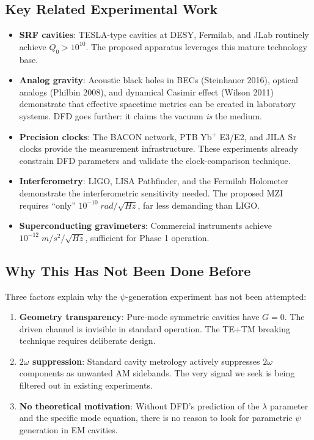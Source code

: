 \documentclass[11pt,a4paper]{article}
\begin{document}
\subsection{Key Related Experimental Work}

\begin{itemize}[nosep]
\item \textbf{SRF cavities}: TESLA-type cavities at DESY, Fermilab,
and JLab routinely achieve $Q_0 > 10^{10}$.  The proposed apparatus
leverages this mature technology base.

\item \textbf{Analog gravity}: Acoustic black holes in BECs
(Steinhauer 2016), optical analogs (Philbin 2008), and dynamical
Casimir effect (Wilson 2011) demonstrate that effective spacetime
metrics can be created in laboratory systems.  DFD goes further:
it claims the vacuum \emph{is} the medium.

\item \textbf{Precision clocks}: The BACON network, PTB Yb$^+$
E3/E2, and JILA Sr clocks provide the measurement infrastructure.
These experiments already constrain DFD parameters and validate
the clock-comparison technique.

\item \textbf{Interferometry}: LIGO, LISA Pathfinder, and
the Fermilab Holometer demonstrate the interferometric sensitivity
needed.  The proposed MZI requires ``only''
$10^{-10}\;\si{rad/\sqrt{Hz}}$, far less demanding than LIGO.

\item \textbf{Superconducting gravimeters}: Commercial instruments
achieve $10^{-12}\;\si{m/s^2/\sqrt{Hz}}$, sufficient for Phase 1
operation.
\end{itemize}

\subsection{Why This Has Not Been Done Before}

Three factors explain why the $\psi$-generation experiment has not
been attempted:

\begin{enumerate}[nosep]
\item \textbf{Geometry transparency}: Pure-mode symmetric cavities
have $G = 0$.  The driven channel is invisible in standard
operation.  The TE+TM breaking technique requires deliberate
design.

\item \textbf{$2\omega$ suppression}: Standard cavity metrology
actively suppresses $2\omega$ components as unwanted AM sidebands.
The very signal we seek is being filtered out in existing
experiments.

\item \textbf{No theoretical motivation}: Without DFD's prediction
of the $\lambda$ parameter and the specific mode equation,
there is no reason to look for parametric $\psi$ generation
in EM cavities.
\end{enumerate}
\end{document}
